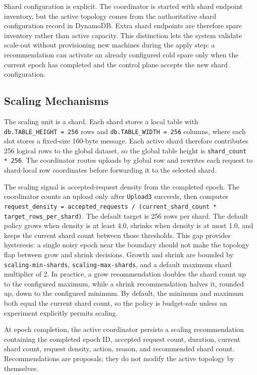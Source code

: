 \documentclass[conference]{IEEEtran}
\begin{document}
Shard configuration is explicit. The coordinator is started with shard endpoint inventory, but the active topology comes from the authoritative shard configuration record in DynamoDB. Extra shard endpoints are therefore spare inventory rather than active capacity. This distinction lets the system validate scale-out without provisioning new machines during the apply step: a recommendation can activate an already configured cold spare only when the current epoch has completed and the control plane accepts the new shard configuration.

\subsection{Scaling Mechanisms}

The scaling unit is a shard. Each shard stores a local table with \texttt{db.TABLE\_HEIGHT = 256} rows and \texttt{db.TABLE\_WIDTH = 256} columns, where each slot stores a fixed-size 160-byte message. Each active shard therefore contributes 256 logical rows to the global dataset, so the global table height is \texttt{shard\_count * 256}. The coordinator routes uploads by global row and rewrites each request to shard-local row coordinates before forwarding it to the selected shard.

The scaling signal is accepted-request density from the completed epoch. The coordinator counts an upload only after \texttt{Upload3} succeeds, then computes \texttt{request\_density = accepted\_requests / (current\_shard\_count * target\_rows\_per\_shard)}. The default target is 256 rows per shard. The default policy grows when density is at least 4.0, shrinks when density is at most 1.0, and keeps the current shard count between those thresholds. This gap provides hysteresis: a single noisy epoch near the boundary should not make the topology flap between grow and shrink decisions. Growth and shrink are bounded by \texttt{scaling-min-shards}, \texttt{scaling-max-shards}, and a default maximum shard multiplier of 2. In practice, a grow recommendation doubles the shard count up to the configured maximum, while a shrink recommendation halves it, rounded up, down to the configured minimum. By default, the minimum and maximum both equal the current shard count, so the policy is budget-safe unless an experiment explicitly permits scaling.

At epoch completion, the active coordinator persists a scaling recommendation containing the completed epoch ID, accepted request count, duration, current shard count, request density, action, reason, and recommended shard count. Recommendations are proposals; they do not modify the active topology by themselves.
\end{document}
